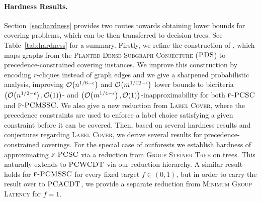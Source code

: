 \paragraph{Hardness Results.} 
Section~\ref{sec:hardness} provides two routes towards obtaining lower bounds for covering problems, which can be then transferred to decision trees. See Table~\ref{tab:hardness} for a summary. Firstly, we refine the construction of \cite{PCMSSC}, which maps graphs from the \textup{\textsc{Planted Dense Subgraph Conjecture}} ($\textup{\textsc{PDS}}$) to precedence-constrained covering instances. We improve this construction by encoding $r$-cliques instead of graph edges and we give a sharpened probabilistic analysis, improving $\mathcal{O}\mathopen{}\left( n^{1/6-\epsilon} \right)$ and $\mathcal{O}\mathopen{}\left( m^{1/12-\epsilon} \right)$ lower bounds to bicriteria $\mathopen{}\left( \mathcal{O}\mathopen{}\left( n^{1/2-\epsilon} \right),\mathcal{O}\mathopen{}\left( 1 \right) \right)$- and $\mathopen{}\left( \mathcal{O}\mathopen{}\left( m^{1/4-\epsilon} \right),\mathcal{O}\mathopen{}\left( 1 \right) \right)$-inapproximability for both $\textup{\textsc{f-PCSC}}$ and $\textup{\textsc{f-PCMSSC}}$. 
We also give a new reduction from \textup{\textsc{Label Cover}}, where the precedence constraints are used to enforce a label choice satisfying a given constraint before it can be covered.
Then, based on several hardness results and conjectures regarding \textup{\textsc{Label Cover}}, we derive several results for precedence-constrained coverings.
For the special case of outforests we establish hardness of approximating $\textup{\textsc{f-PCSC}}$ via a reduction from \textup{\textsc{Group Steiner Tree}} on trees.
This naturally extends to $\textup{\textsc{PCWCDT}}$ via our reduction hierarchy. A similar result holds for $\textup{\textsc{f-PCMSSC}}$ for every fixed target $f\in(0,1)$, but in order to carry the result over to $\textup{\textsc{PCACDT}}$, we provide a separate reduction from \textup{\textsc{Minimum Group Latency}} for $f=1$. 



